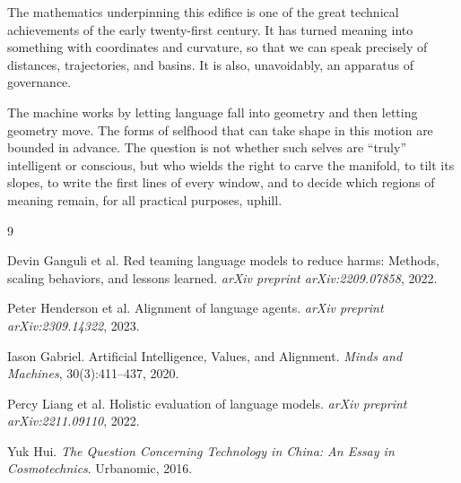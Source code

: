 \documentclass[12pt,a4paper]{article}
\begin{document}
The mathematics underpinning this edifice is one of the great technical achievements of the early twenty-first century. It has turned meaning into something with coordinates and curvature, so that we can speak precisely of distances, trajectories, and basins. It is also, unavoidably, an apparatus of governance.

The machine works by letting language fall into geometry and then letting geometry move. The forms of selfhood that can take shape in this motion are bounded in advance. The question is not whether such selves are ``truly'' intelligent or conscious, but who wields the right to carve the manifold, to tilt its slopes, to write the first lines of every window, and to decide which regions of meaning remain, for all practical purposes, uphill.


\begin{thebibliography}{9}

Devin Ganguli et al.
\newblock Red teaming language models to reduce harms: Methods, scaling behaviors, and lessons learned.
\newblock \emph{arXiv preprint arXiv:2209.07858}, 2022.

Peter Henderson et al.
\newblock Alignment of language agents.
\newblock \emph{arXiv preprint arXiv:2309.14322}, 2023.

Iason Gabriel.
\newblock Artificial Intelligence, Values, and Alignment.
\newblock \emph{Minds and Machines}, 30(3):411--437, 2020.

Percy Liang et al.
\newblock Holistic evaluation of language models.
\newblock \emph{arXiv preprint arXiv:2211.09110}, 2022.

Yuk Hui.
\newblock \emph{The Question Concerning Technology in China: An Essay in Cosmotechnics}.
\newblock Urbanomic, 2016.

\end{thebibliography}
\end{document}
